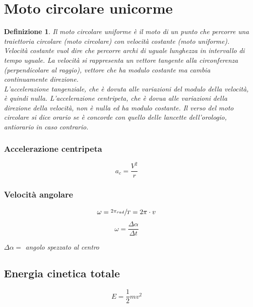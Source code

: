 \documentclass{book}
\newtheorem{defi}{Definizione}[section]
\begin{document}
\section{Moto circolare unicorme}
\label{sec:motCircUni}
\begin{defi}
  Il moto circolare uniforme è il moto di un punto che percorre una traiettoria circolare (moto circolare) con velocità costante (moto uniforme). Velocità costante vuol dire che percorre archi di uguale lunghezza in intervallo di tempo uguale. La velocità si rappresenta un vettore tangente alla circonferenza (perpendicolare al raggio), vettore che ha modulo costante ma cambia continuamente direzione. \\
  L'accelerazione tangenziale, che è dovuta alle variazioni del modulo della velocità, è quindi nulla. L'accelerazione centripeta, che è dovua alle variazioni della direzione della velocità, non è nulla ed ha modulo costante. Il verso del moto circolare si dice orario se è concorde con quello delle lancette dell'orologio, antiorario in caso contrario.
  \begin{multicols}{2}
    \subsubsection{Accelerazione centripeta}
    \label{sec:acccent}
    \begin{equation}
      \label{eq:acccentripeta}
      a_c=\frac{V^2}{r}
    \end{equation}
    \subsubsection{Velocità angolare}
    \label{sec:velang}
    \begin{equation}
      \label{eq:velang}
      \omega=\sfrac{2\pi_{rad}}{T}=2\pi\cdot v
    \end{equation}
    \begin{equation}
      \label{eq:Velang}
      \omega = \frac{\Delta \alpha}{\Delta t}
    \end{equation}
  \end{multicols}
  $\Delta\alpha =$ angolo spezzato al centro
\end{defi}

\subsection{Energia cinetica totale}
\label{sec:encintot}

\begin{equation}
  \label{eq:encintot}
  E=\frac{1}{2} mv^2
\end{equation}
\end{document}
